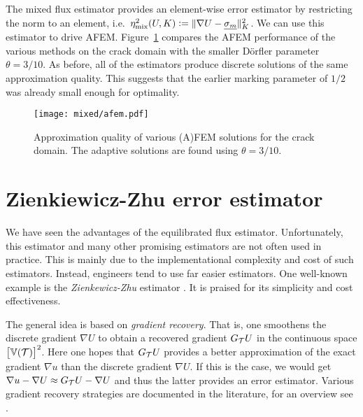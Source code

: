 \documentclass[thesis.tex]{subfiles}
\begin{document}
The mixed flux estimator provides an element-wise error estimator by restricting the norm to an element, i.e.~$\eta^2_\text{mix}(U, K) := \| \nabla U - \underline{\sigma_m} \|^2_K$. 
We can use this estimator to drive AFEM. 
Figure~\ref{fig:afemmixed} compares the AFEM performance of the various methods on the crack domain with the smaller D\"orfler
parameter $\theta = 3/10$.  As before, all of the estimators produce discrete solutions of the same approximation quality. This
suggests that the earlier marking parameter of $1/2$ was already small enough for optimality.
\begin{figure}
  \centering
  \texttt{[image: mixed/afem.pdf]}
  \caption{
    Approximation quality of various (A)FEM solutions for the crack domain. The adaptive solutions are found using $\theta = 3/10$.
  }
  \label{fig:afemmixed}
\end{figure}
\section{Zienkiewicz-Zhu error estimator}
We have seen the advantages of the equilibrated flux estimator.
 Unfortunately, this estimator and many other promising
estimators are not often used in practice. This is mainly due to the implementational complexity and cost of such estimators.
Instead, engineers tend to use far easier estimators. One well-known example is the \emph{Zienkewicz-Zhu} estimator 
\cite{zienkiewicz1987simple, zienkiewicz1992superconvergent}. It is praised for its simplicity and cost effectiveness.

The general idea is based on \emph{gradient recovery}. That is, one smoothens the discrete gradient $\nabla U$ to obtain a
recovered gradient $G_{\mathcal{T}} U$ in the continuous space $\left[\mathbb{V}(\mathcal{T})\right]^2$. Here
one hopes that $G_{\mathcal{T}} U$ provides a better approximation of the exact gradient $\nabla u$ than the discrete gradient $\nabla U$.
If this is the case, we would get $\nabla u - \nabla U \approx G_{\mathcal{T}} U - \nabla U$ and thus the latter provides
an error estimator.  
Various gradient recovery strategies are documented in the literature, for an overview see \cite{zienkiewicz1992superconvergent}. 
\end{document}
